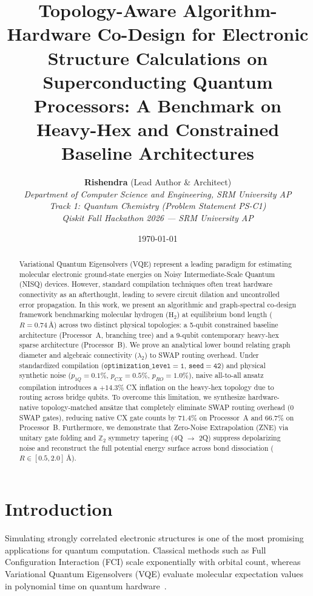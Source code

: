 \documentclass[journal,twocolumn]{article}
\title{\textbf{Topology-Aware Algorithm-Hardware Co-Design for Electronic Structure Calculations on Superconducting Quantum Processors: A Benchmark on Heavy-Hex and Constrained Baseline Architectures}}
\author{
  \textbf{Rishendra} (Lead Author \& Architect) \\
  \textit{Department of Computer Science and Engineering, SRM University AP} \\
  \textit{Track 1: Quantum Chemistry (Problem Statement PS-C1)} \\
  \textit{Qiskit Fall Hackathon 2026 --- SRM University AP}
}
\date{\today}
\begin{document}
\maketitle

\begin{abstract}
Variational Quantum Eigensolvers (VQE) represent a leading paradigm for estimating molecular electronic ground-state energies on Noisy Intermediate-Scale Quantum (NISQ) devices. However, standard compilation techniques often treat hardware connectivity as an afterthought, leading to severe circuit dilation and uncontrolled error propagation. In this work, we present an algorithmic and graph-spectral co-design framework benchmarking molecular hydrogen ($\mathrm{H}_2$) at equilibrium bond length ($R = 0.74\,\text{\AA}$) across two distinct physical topologies: a 5-qubit constrained baseline architecture (Processor~A, branching tree) and a 9-qubit contemporary heavy-hex sparse architecture (Processor~B). We prove an analytical lower bound relating graph diameter and algebraic connectivity ($\lambda_2$) to SWAP routing overhead. Under standardized compilation ($\mathtt{optimization\_level=1}$, $\mathtt{seed=42}$) and physical synthetic noise ($p_{1Q}=0.1\%$, $p_{CX}=0.5\%$, $p_{RO}=1.0\%$), naive all-to-all ansatz compilation introduces a $+14.3\%$ CX inflation on the heavy-hex topology due to routing across bridge qubits. To overcome this limitation, we synthesize hardware-native topology-matched ansätze that completely eliminate SWAP routing overhead ($0$ SWAP gates), reducing native CX gate counts by $71.4\%$ on Processor~A and $66.7\%$ on Processor~B. Furthermore, we demonstrate that Zero-Noise Extrapolation (ZNE) via unitary gate folding and $\mathbb{Z}_2$ symmetry tapering (4Q $\to$ 2Q) suppress depolarizing noise and reconstruct the full potential energy surface across bond dissociation ($R \in [0.5, 2.0]\,\text{\AA}$).
\end{abstract}

\section{Introduction}
Simulating strongly correlated electronic structures is one of the most promising applications for quantum computation. Classical methods such as Full Configuration Interaction (FCI) scale exponentially with orbital count, whereas Variational Quantum Eigensolvers (VQE) evaluate molecular expectation values in polynomial time on quantum hardware~\cite{Peruzzo2014, McArdle2020}.
\end{document}
